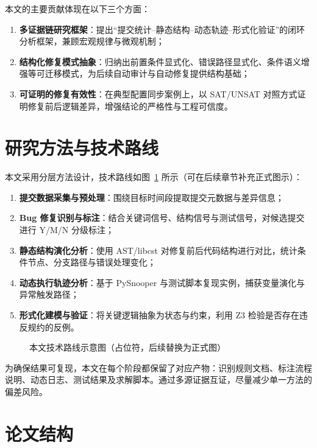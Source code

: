 本文的主要贡献体现在以下三个方面：
\begin{enumerate}
  \item \textbf{多证据链研究框架}：提出“提交统计--静态结构--动态轨迹--形式化验证”的闭环分析框架，兼顾宏观规律与微观机制；
  \item \textbf{结构化修复模式抽象}：归纳出前置条件显式化、错误路径显式化、条件语义增强等可迁移模式，为后续自动审计与自动修复提供结构基础；
  \item \textbf{可证明的修复有效性}：在典型配置同步案例上，以 SAT/UNSAT 对照方式证明修复前后逻辑差异，增强结论的严格性与工程可信度。
\end{enumerate}

\section{研究方法与技术路线}

本文采用分层方法设计，技术路线如图~\ref{fig:tech-route} 所示（可在后续章节补充正式图示）：
\begin{enumerate}
  \item \textbf{提交数据采集与预处理}：围绕目标时间段提取提交元数据与差异信息；
  \item \textbf{Bug 修复识别与标注}：结合关键词信号、结构信号与测试信号，对候选提交进行 Y/M/N 分级标注；
  \item \textbf{静态结构演化分析}：使用 AST/libcst 对修复前后代码结构进行对比，统计条件节点、分支路径与错误处理变化；
  \item \textbf{动态执行轨迹分析}：基于 PySnooper 与测试脚本复现实例，捕获变量演化与异常触发路径；
  \item \textbf{形式化建模与验证}：将关键逻辑抽象为状态与约束，利用 Z3 检验是否存在违反规约的反例。
\end{enumerate}

\begin{figure}[H]
  \centering
  \caption{本文技术路线示意图（占位符，后续替换为正式图）}
  \label{fig:tech-route}
\end{figure}

为确保结果可复现，本文在每个阶段都保留了对应产物：识别规则文档、标注流程说明、动态日志、测试结果及求解脚本。通过多源证据互证，尽量减少单一方法的偏差风险。

\section{论文结构}

